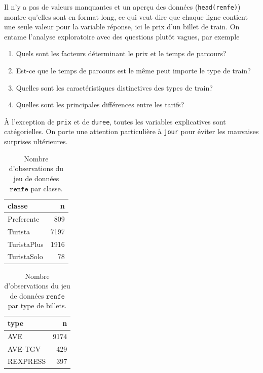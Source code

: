 \documentclass[
  11pt,
  letterpaper,
]{article}
\providecommand{\tightlist}{%
  \setlength{\itemsep}{0pt}\setlength{\parskip}{0pt}}
\theoremstyle{definition}
\theoremstyle{definition}
\theoremstyle{definition}
\theoremstyle{definition}
\theoremstyle{remark}
\begin{document}
Il n'y a pas de valeurs manquantes et un aperçu des données (\texttt{head(renfe)}) montre qu'elles sont en format long, ce qui veut dire que chaque ligne contient une seule valeur pour la variable réponse, ici le prix d'un billet de train. On entame l'analyse exploratoire avec des questions plutôt vagues, par exemple

\begin{enumerate}
\def\labelenumi{\arabic{enumi}.}
\tightlist
\item
  Quels sont les facteurs déterminant le prix et le temps de parcours?
\item
  Est-ce que le temps de parcours est le même peut importe le type de train?
\item
  Quelles sont les caractéristiques distinctives des types de train?
\item
  Quelles sont les principales différences entre les tarifs?
\end{enumerate}

À l'exception de \texttt{prix} et de \texttt{duree}, toutes les variables explicatives sont catégorielles. On porte une attention particulière à \texttt{jour} pour éviter les mauvaises surprises ultérieures.

\begin{table}

\caption{\label{tab:renfe-aed1a}Nombre d'observations du jeu de données $\texttt{renfe}$ par classe.}
\centering
\begin{tabular}[t]{lr}
\toprule
classe & n\\
\midrule
Preferente & 809\\
Turista & 7197\\
TuristaPlus & 1916\\
TuristaSolo & 78\\
\bottomrule
\end{tabular}
\end{table}

\begin{table}

\caption{\label{tab:renfe-aed1b}Nombre d'observations du jeu de données $\texttt{renfe}$ par type de billets.}
\centering
\begin{tabular}[t]{lr}
\toprule
type & n\\
\midrule
AVE & 9174\\
AVE-TGV & 429\\
REXPRESS & 397\\
\bottomrule
\end{tabular}
\end{table}
\end{document}
